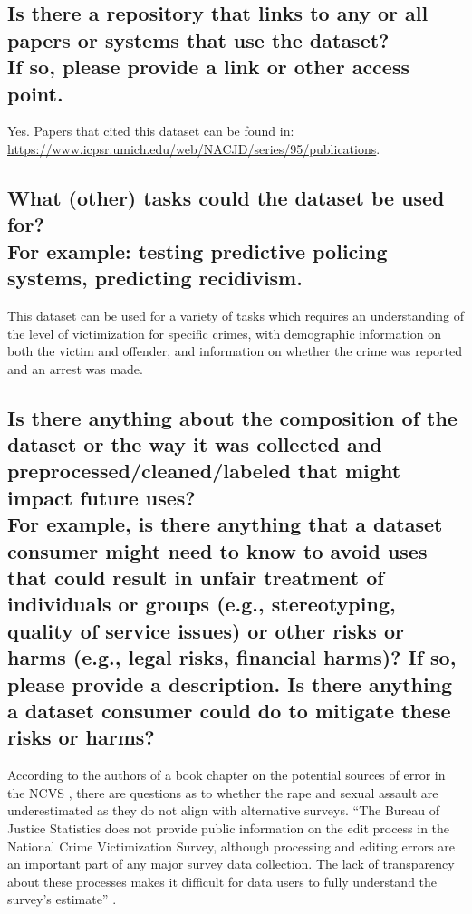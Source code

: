 \documentclass[letterpaper, 10 pt, conference]{ieeeconf}  %
\newcommand{\subtitle}[1]{{\\ \small \normalfont \color{purple} #1}}
\begin{document}
\subsection{Is there a repository that links to any or all papers or systems that use the dataset? \subtitle{If so, please provide a link or other access point. }}

Yes. Papers that cited this dataset can be found in: \\
\href{https://www.icpsr.umich.edu/web/NACJD/series/95/publications}{https://www.icpsr.umich.edu/web/NACJD/series/95/publications}.

\subsection{What (other) tasks could the dataset be used for? \subtitle{For example: testing predictive policing systems, predicting recidivism.}}

This dataset can be used for a variety of tasks which requires an understanding of the level of victimization for specific crimes, with demographic information on both the victim and offender, and information on whether the crime was reported and an arrest was made. 

\subsection{Is there anything about the composition of the dataset or the way it was collected and preprocessed/cleaned/labeled that might impact future uses? \subtitle{For example, is there anything that a dataset consumer might need to know to avoid uses that could result in unfair treatment of individuals or groups (e.g., stereotyping, quality of service issues) or other risks or harms (e.g., legal risks, financial harms)? If so, please provide a description. Is there anything a dataset consumer could do to mitigate these risks or harms?}}

According to the authors of a book chapter on the potential sources of error in the NCVS \cite{kruttschnitt2014potential}, there are questions as to whether the rape and sexual assault are underestimated as they do not align with alternative surveys. ``The Bureau of Justice Statistics does not provide public information on the edit process in the National Crime Victimization Survey, although processing and editing errors are an important part of any major survey data collection. The lack of transparency about these processes makes it difficult for data users to fully understand the survey's estimate'' \cite{kruttschnitt2014potential}. 
\end{document}
